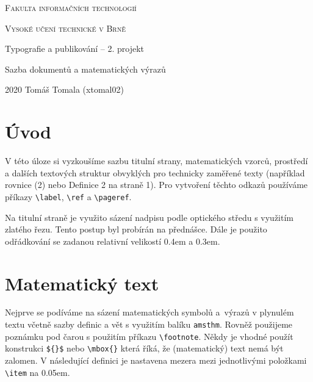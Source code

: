 \documentclass[a4paper, 11pt]{article}
\begin{document}
 \begin{titlepage} 
    \begin{center}
        \thispagestyle{empty}
        \Huge \textsc{Fakulta informačních technologií}

        \textsc{Vysoké učení technické v Brně}

        \LARGE Typografie a publikování – 2. projekt

        Sazba dokumentů a matematických výrazů
        \end{center}
    {\Large 2020  \hfill Tomáš Tomala (xtomal02)}
 \end{titlepage}
    \newpage
{} 
\twocolumn
\section*{Úvod}
V této úloze si vyzkoušíme sazbu titulní strany, matematických vzorců, prostředí a dalších textových struktur obvyklých pro technicky zaměřené texty (například rovnice (2) nebo Definice 2 na straně 1). Pro vytvoření těchto odkazů používáme příkazy \verb|\label|, \verb|\ref| a \verb|\pageref|.

Na titulní straně je využito sázení nadpisu podle optického středu s využitím zlatého řezu. Tento postup byl probírán na přednášce. Dále je použito odřádkování se zadanou relativní velikostí 0.4em a 0.3em.
\section{Matematický text}
Nejprve se podíváme na sázení matematických symbolů a~výrazů v plynulém textu včetně sazby definic a vět s využitím balíku \verb|amsthm|. Rovněž použijeme poznámku pod čarou s použitím příkazu \verb|\footnote|. Někdy je vhodné
použít konstrukci \verb|${}$| nebo \verb|\mbox{}| která říká, že
(matematický) text nemá být zalomen. V následující definici je nastavena mezera mezi jednotlivými položkami
\verb|\item| na 0.05em.
\end{document}

